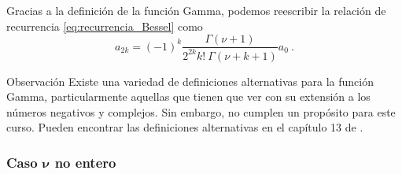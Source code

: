 Gracias a la definición de la función Gamma, podemos reescribir la relación de recurrencia \eqref{eq:recurrencia_Bessel} como
\begin{equation}
    a_{2k} = (-1)^k \frac{\Gamma(\nu + 1)}{2^{2k} k! \ \Gamma(\nu + k + 1)} a_0 \ .
\end{equation}

\begin{obs}{Observación}
    Existe una variedad de definiciones alternativas para la función Gamma, particularmente aquellas que tienen que ver con su extensión a los números negativos y complejos. Sin embargo, no cumplen un propósito para este curso. Pueden encontrar las definiciones alternativas en el capítulo 13 de \cite{Arfken}.
\end{obs}



\subsubsection{Caso $\boldsymbol{\nu}$ no entero}

